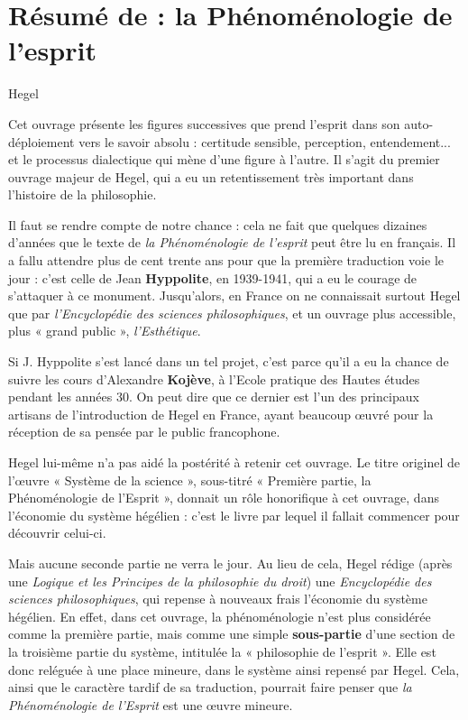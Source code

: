 
\section{Résumé de : la Phénoménologie de l'esprit}


Hegel

Cet ouvrage présente les figures successives que prend l'esprit dans son auto-déploiement vers le savoir absolu : certitude sensible, perception, entendement... et le processus dialectique qui mène d'une figure à l'autre.
Il s'agit du premier ouvrage majeur de Hegel, qui a eu un retentissement très important dans l'histoire de la philosophie.


Il faut se rendre compte de notre chance : cela ne fait que quelques dizaines d’années que le texte de {\it la Phénoménologie de l’esprit} peut être lu en français. Il a fallu attendre plus de cent trente ans pour que la première traduction voie le jour : c’est celle de Jean {\bf Hyppolite}, en 1939-1941, qui a eu le courage de s’attaquer à ce monument. Jusqu’alors, en France on ne connaissait surtout Hegel que par {\it l’Encyclopédie des sciences philosophiques}, et un ouvrage plus accessible, plus « grand public », {\it l’Esthétique}.

Si J. Hyppolite s’est lancé dans un tel projet, c’est parce qu’il a eu la chance de suivre les cours d’Alexandre {\bf Kojève}, à l’Ecole pratique des Hautes études pendant les années 30. On peut dire que ce dernier est l’un des principaux artisans de l’introduction de Hegel en France, ayant beaucoup œuvré pour la réception de sa pensée par le public francophone.

Hegel lui-même n’a pas aidé la postérité à retenir cet ouvrage. Le titre originel de l’œuvre « Système de la science », sous-titré « Première partie, la Phénoménologie de l’Esprit », donnait un rôle honorifique à cet ouvrage, dans l’économie du système hégélien : c’est le livre par lequel il fallait commencer pour découvrir celui-ci.

Mais aucune seconde partie ne verra le jour. Au lieu de cela, Hegel rédige (après une {\it Logique et les Principes de la philosophie du droit}) une {\it Encyclopédie des sciences philosophiques}, qui repense à nouveaux frais l’économie du système hégélien. En effet, dans cet ouvrage, la phénoménologie n’est plus considérée comme la première partie, mais comme une simple {\bf sous-partie} d’une section de la troisième partie du système, intitulée la « philosophie de l’esprit ». Elle est donc reléguée à une place mineure, dans le système ainsi repensé par Hegel. Cela, ainsi que le caractère tardif de sa traduction, pourrait faire penser que {\it la Phénoménologie de l’Esprit} est une œuvre mineure.

